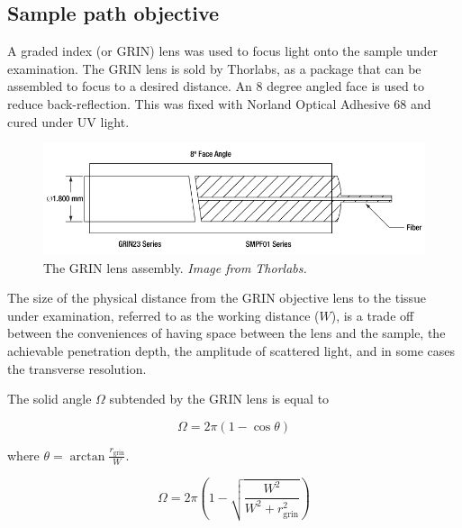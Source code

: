 
\subsection{Sample path objective}

A graded index (or GRIN) lens was used to focus light onto the sample under examination. The GRIN lens is sold by Thorlabs, as a package that can be assembled to focus to a desired distance. An 8 degree angled face is used to reduce back-reflection. This was fixed with Norland Optical Adhesive 68 and cured under UV light.

\begin{figure}[h!]
\centering
\includegraphics[width=1.0\textwidth]{Images/System/grin_angled.png}
\caption[The GRIN lens assembly.]{The GRIN lens assembly. \em{Image from Thorlabs.} \label{fig:grin_assembly}}
\end{figure}

The size of the physical distance from the GRIN objective lens to the tissue under examination, referred to as the working distance ($W$), is a trade off between the conveniences of having space between the lens and the sample, the achievable penetration depth, the amplitude of scattered light, and in some cases the transverse resolution.


The solid angle $\Omega$ subtended by the GRIN lens is equal to

\begin{equation}
\Omega = 2 \pi (1 - \cos{\theta})
\end{equation}

where $\theta = \arctan{\frac{r_{\mathrm{grin}}}{W}}$.

\begin{equation}
\Omega = 2 \pi \left(1 - \sqrt{\frac{W^2}{W^2 + r_{\mathrm{grin}}^2}} \right)
\end{equation}

